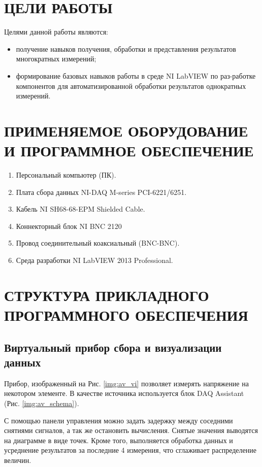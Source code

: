 \documentclass[a4paper,14pt]{article}
\begin{document}

\tableofcontents
\pagebreak

\section{ЦЕЛИ РАБОТЫ}
Целями данной работы являются:

\begin{itemize}
    \item получение навыков получения, обработки и представления результатов многократных измерений;
    \item формирование базовых навыков работы в среде NI LabVIEW по раз-работке компонентов для автоматизированной обработки результатов однократных измерений.
\end{itemize}

\section{ПРИМЕНЯЕМОЕ ОБОРУДОВАНИЕ И ПРОГРАММНОЕ ОБЕСПЕЧЕНИЕ}

\begin{enumerate}
    \item    Персональный компьютер (ПК).
    \item    Плата сбора данных NI-DAQ M-series PCI-6221/6251.
    \item    Кабель NI SH68-68-EPM Shielded Cable.
    \item    Коннекторный блок NI BNC 2120
    \item    Провод соединительный коаксиальный (BNC-BNC).
    \item    Среда разработки NI LabVIEW 2013 Professional.
\end{enumerate}


\section{СТРУКТУРА ПРИКЛАДНОГО     ПРОГРАММНОГО ОБЕСПЕЧЕНИЯ}
\subsection{Виртуальный прибор сбора и визуализации данных}

Прибор, изображенный на Рис. \ref{img:av_vi} позволяет измерять напряжение на некотором элементе.
В качестве источника используется блок DAQ Assistant (Рис. \ref{img:av_schema}).

С помощью панели управления можно задать задержку между соседними снятиями сигналов, а так же остановить вычисления.
Снятые значения выводятся на диаграмме в виде точек.
Кроме того, выполняется обработка данных и усреднение результатов за последние 4 измерения, что сглаживает распределение величин.
\end{document}
